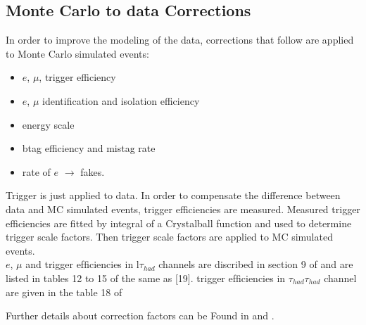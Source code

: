 \subsection{Monte Carlo to data Corrections}
\label{sec:scaleFactors}
In order to improve the modeling of the data, corrections that follow are
 applied  to Monte Carlo simulated events:
\begin{itemize}
\item $e$, $\mu$, \Tau trigger efficiency
\item $e$, $\mu$ identification and isolation efficiency
\item \Tau energy scale
\item btag efficiency and mistag rate
\item rate of $e$ $\rightarrow$ \Tau  fakes.
\end{itemize}

Trigger is just applied to data. In order to compensate the difference between data and MC simulated events, trigger efficiencies are measured. Measured trigger efficiencies are fitted by integral of a Crystalball function and used to determine trigger scale factors. Then
trigger scale factors  are applied to MC simulated  events.
\\
 $e$, $\mu$  and \Tau trigger efﬁciencies in l$\tau_{had}$ channels are discribed in section 9 of\cite{CMS_AN_2013-171}  and are listed in tables 12 to 15 of the same as [19].
\Tau trigger efﬁciencies in $\tau_{had}\tau_{had}$ channel are given in the table 18 of \cite{CMS_AN_2013-011}
 
Further details about correction factors can be Found  in  \cite{CMS_AN_2013-171} and \cite{HiggsTauTautwiki}.


 
